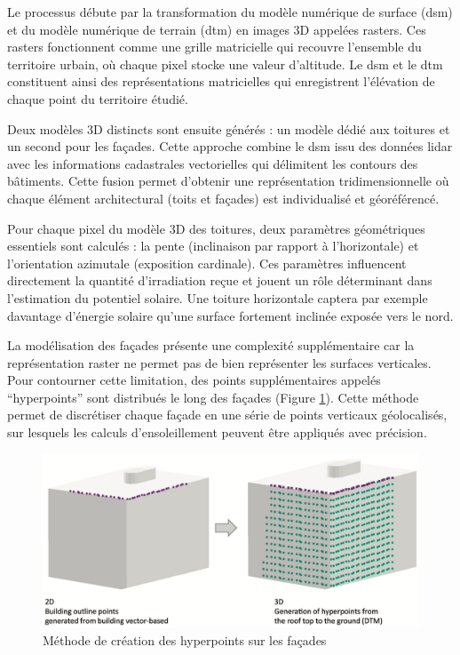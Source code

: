 Le processus débute par la transformation du modèle numérique de surface (\acrshort{dsm}) et du modèle numérique de terrain (\acrshort{dtm}) en images 3D appelées rasters. Ces rasters fonctionnent comme une grille matricielle qui recouvre l'ensemble du territoire urbain, où chaque pixel stocke une valeur d'altitude. Le \acrshort{dsm} et le \acrshort{dtm} constituent ainsi des représentations matricielles qui enregistrent l'élévation de chaque point du territoire étudié.

Deux modèles 3D distincts sont ensuite générés : un modèle dédié aux toitures et un second pour les façades. Cette approche combine le \acrshort{dsm} issu des données \gls{lidar} avec les informations cadastrales vectorielles qui délimitent les contours des bâtiments. Cette fusion permet d'obtenir une représentation tridimensionnelle où chaque élément architectural (toits et façades) est individualisé et géoréférencé.

Pour chaque pixel du modèle 3D des toitures, deux paramètres géométriques essentiels sont calculés : la pente (inclinaison par rapport à l'horizontale) et l'orientation azimutale (exposition cardinale). Ces paramètres influencent directement la quantité d'irradiation reçue et jouent un rôle déterminant dans l'estimation du potentiel solaire. Une toiture horizontale captera par exemple davantage d'énergie solaire qu'une surface fortement inclinée exposée vers le nord.

La modélisation des façades présente une complexité supplémentaire car la représentation raster ne permet pas de bien représenter les surfaces verticales. Pour contourner cette limitation, des points supplémentaires appelés ``hyperpoints'' sont distribués le long des façades (Figure \ref{fig:cadastre_solaire_hyperpoints}). Cette méthode permet de discrétiser chaque façade en une série de points verticaux géolocalisés, sur lesquels les calculs d'ensoleillement peuvent être appliqués avec précision.

\begin{figure}[H]
    \centering
    \includegraphics[width=1\linewidth]{02-main//figures/ch2/cadastre_solaire_hyperpoints.png}
    \caption{Méthode de création des hyperpoints sur les façades \cite{desthieux_solar_2018}}
    \label{fig:cadastre_solaire_hyperpoints}
\end{figure}

